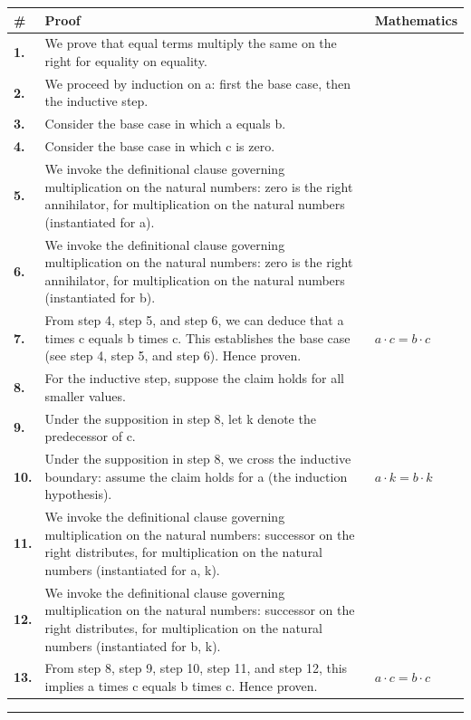 \documentclass[11pt]{article}
\theoremstyle{definition}
\begin{document}
\begin{tabular}{@{} >{\raggedright\arraybackslash}p{} >{\raggedright\arraybackslash}p{} >{\raggedleft\arraybackslash}p{} @{}}
\textbf{\#} & \textbf{Proof} & \textbf{Mathematics} \\
\midrule
\textbf{1.} & We prove that equal terms multiply the same on the right for equality on equality. & \\[0.45em]
\textbf{2.} & We proceed by induction on a: first the base case, then the inductive step. & \\[0.45em]
\textbf{3.} & Consider the base case in which a  equals  b. & \\[0.45em]
\textbf{4.} & Consider the base case in which c is zero. & \\[0.45em]
\textbf{5.} & We invoke the definitional clause governing multiplication on the natural numbers: zero is the right annihilator, for multiplication on the natural numbers (instantiated for a). & \\[0.45em]
\textbf{6.} & We invoke the definitional clause governing multiplication on the natural numbers: zero is the right annihilator, for multiplication on the natural numbers (instantiated for b). & \\[0.45em]
\textbf{7.} & From step 4, step 5, and step 6, we can deduce that a times c equals b times c. This establishes the base case (see step 4, step 5, and step 6). Hence proven. & $\displaystyle a \cdot c = b \cdot c$ \\[0.45em]
\textbf{8.} & For the inductive step, suppose the claim holds for all smaller values. & \\[0.45em]
\textbf{9.} & Under the supposition in step 8, let k denote the predecessor of c. & \\[0.45em]
\textbf{10.} & Under the supposition in step 8, we cross the inductive boundary: assume the claim holds for a (the induction hypothesis). & $\displaystyle a \cdot k = b \cdot k$ \\[0.45em]
\textbf{11.} & We invoke the definitional clause governing multiplication on the natural numbers: successor on the right distributes, for multiplication on the natural numbers (instantiated for a, k). & \\[0.45em]
\textbf{12.} & We invoke the definitional clause governing multiplication on the natural numbers: successor on the right distributes, for multiplication on the natural numbers (instantiated for b, k). & \\[0.45em]
\textbf{13.} & From step 8, step 9, step 10, step 11, and step 12, this implies a times c equals b times c. Hence proven. & $\displaystyle a \cdot c = b \cdot c$ \\[0.45em]
\bottomrule
\end{tabular}
\label{thm:Eq-equality-equal_terms_multiply_the_same_on_the_right}
\par\medskip\hrule
\end{document}
